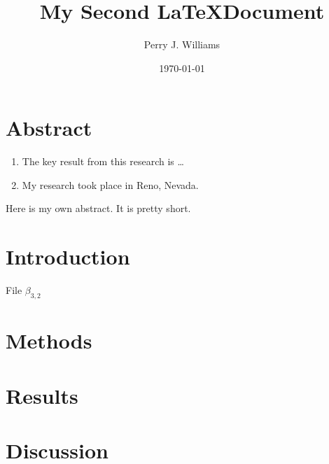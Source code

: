 \documentclass{article}
\title{My Second \LaTeX Document}
\author{Perry J. Williams}
\date{\today}
\begin{document}
\maketitle
\section*{Abstract}
\begin{enumerate}
\item The key result from this research is \ldots
\item My research took place in Reno, Nevada.
\end{enumerate}



Here is my own abstract. It is pretty short. 

\section*{Introduction}
\lipsum[1]
File $\beta_{3,2}$

\section*{Methods}
\lipsum[1]

\section*{Results}
\lipsum[1]

\section*{Discussion}
\lipsum[1]
\end{document}
